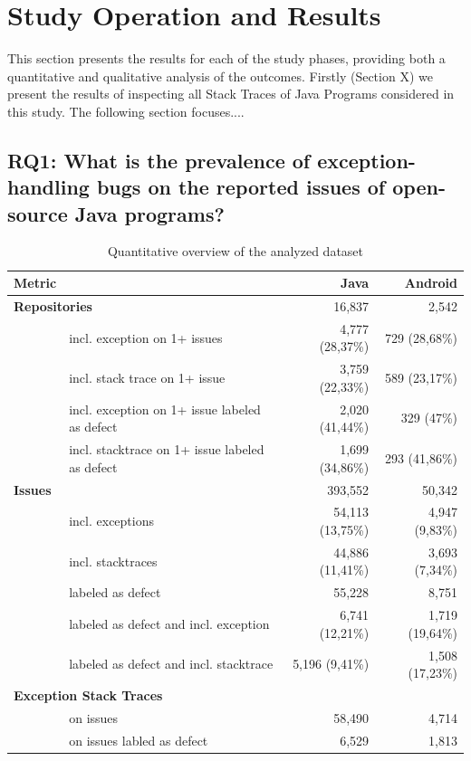 \documentclass[conference]{IEEEtran}
\begin{document}
\section{Study Operation and Results}
This section presents the results for each of the study phases, providing both a quantitative and qualitative analysis of the outcomes. Firstly (Section X) we present the results of inspecting all Stack Traces  of Java Programs considered in this study. The following section focuses....


\subsection{RQ1: What is the prevalence of exception-handling bugs on the reported issues of open-source Java programs?}



\begin{table}
\centering
\begin{tabular}{p{1em}lrr}
\hline
 \bfseries{Metric} & & \bfseries{Java} & \bfseries{Android}  \\
\hline
 \multicolumn{2}{l}{\bfseries{Repositories}} & 16,837 & 2,542\\
    & incl. exception on 1+ issues & 4,777 (28,37\%) & 729 (28,68\%)\\
    & incl. stack trace on 1+ issue & 3,759 (22,33\%) & 589 (23,17\%)\\
    & incl. exception on 1+ issue labeled as defect & 2,020 (41,44\%) &  329 (47\%)\\
    & incl. stacktrace on 1+ issue labeled as defect  & 1,699 (34,86\%) & 293 (41,86\%)\\
 \multicolumn{2}{l}{\bfseries{Issues}} & 393,552 & 50,342\\
    & incl. exceptions & 54,113 (13,75\%) & 4,947 (9,83\%) \\
    & incl. stacktraces & 44,886 (11,41\%) & 3,693 (7,34\%) \\
    & labeled as defect & 55,228 & 8,751 \\
    & labeled as defect and incl. exception & 6,741 (12,21\%) & 1,719 (19,64\%) \\
    & labeled as defect and incl. stacktrace &  5,196 (9,41\%) & 1,508 (17,23\%)\\
\multicolumn{2}{l}{\bfseries{Exception Stack Traces}} &  & \\
    & on issues  & 58,490  & 4,714  \\
    & on issues labled as defect & 6,529 & 1,813 \\
 
\hline
\end{tabular}
\caption{Quantitative overview of the analyzed dataset}
\label{tab:overview}
\end{table}
\end{document}
